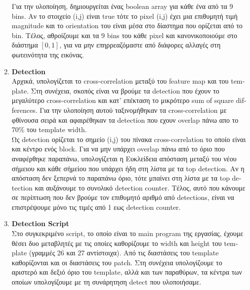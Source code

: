 \documentclass{article}
\newcommand{\tl}[1]{\textlatin{#1}}
\begin{document}
\begin{enumerate}[label=\arabic*.]
		\noindent
		Για την υλοποίηση, δημιουργείται ένας \tl{boolean array} για κάθε ένα από τα 9 \tl{bins.} Αν το στοιχείο \tl{(i,j)} είναι \tl{true}
		τότε το \tl{pixel (i,j)} έχει μια επιθυμητή τιμή \tl{magnitude} και το \tl{orientation} του είναι μέσα στο δίαστημα που ορίζεται από το 
		\tl{bin}. Τέλος, αθροίζουμε και τα 9 \tl{bins} του κάθε \tl{pixel} και κανονικοποιούμε στο διάστημα $\left[0,1\right]$, για να μην επηρρεαζόμαστε 
		από διάφορες αλλαγές στη φωτεινότητα της εικόνας.
		\\
		\item \textbf{\tl{Detection}} \\
		Αρχικά, υπολογίζεται το \tl{cross-correlation} μεταξύ του \tl{feature map} και του \tl{template}. Στη συνέχεια, σκοπός είναι να 
		βρούμε τα \tl{detection} που έχουν το μεγαλύτερο \tl{cross-correlation} και κατ' επέκταση το μικρότερο \tl{sum of square differences}. Για την υλοποίηση
		αυτού ταξινομήθηκαν τα \tl{cross-correlation} με φθίνουσα σειρά και αφαιρέθηκαν τα \tl{detection} που εχουν \tl{overlap} πάνω απο το 70\% του \tl{template width.}\\
		
		\noindent
		Ως \tl{detection} ορίζεται το σημείο \tl{(i,j)} του πίνακα \tl{cross-correlation} το οποίο είναι και κέντρο ενός \tl{block}. Για να μην υπάρχει \tl{overlap} πάνω από 
		το όριο που αναφέρθηκε παραπάνω, υπολογίζεται η Ευκλείδεια απόσταση μεταξύ του νέου σήμειου και κάθε σήμείου που υπάρχει ήδη στη λίστα με τα \tl{top detection}. Αν η απόσταση
		δεν ξεπερνά το παραπάνω όριο, τότε μπαίνει στη λίστα με τα \tl{top detection} και αυξάνουμε το συνολικό \tl{detection counter}. Tέλος, αυτό που κάνουμε σε περίπτωση που 
		δεν βρούμε τον επιθυμητό αριθμό από \tl{detections}, είναι να επιστρέψουμε μόνο τις τιμές από 1 εως \tl{detection counter}.
		
		\item \textbf{\tl{Detection Script}} \\
		Στο συγκεκριμένο \tl{script}, το οποίο είναι το \tl{main program} της εργασίας, έχουμε θέσει δυο μεταβλητές με τις οποίες καθορίζουμε το \tl{width} και \tl{height} του \tl{template} (γραμμές 26 και 27 αντίστοιχα). Από τις διαστάσεις του \tl{template} καθορίζονται και οι διαστάσεις του \tl{patch}. Στη συνέχεια υπολογίζουμε το αριστερό και δεξιό όριο του template, αλλά και των παραθύρων, τα κέντρα των οποίων υπολογίζουμε με τη συνάρητηση \tl{detect} που υλοποιήσαμε.\\\\
		

\end{enumerate}
\end{document}
